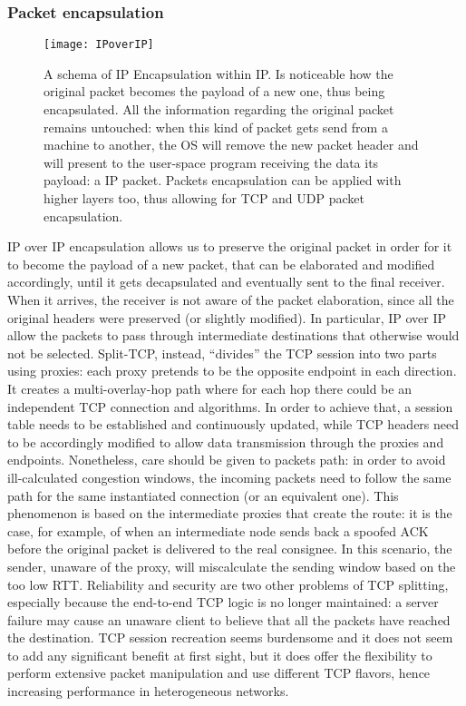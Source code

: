 \subsubsection*{Packet encapsulation}
\begin{figure}[t]
  \centering \texttt{[image: IPoverIP]}
  \caption[IP Encapsulation within IP packet schema]{A schema of IP
    Encapsulation within IP. Is noticeable how the original packet becomes the
    payload of a new one, thus being encapsulated. All the information
    regarding the original packet remains untouched: when this kind of packet
    gets send from a machine to another, the OS will remove the new packet
    header and will present to the user-space program receiving the data its
    payload: a IP packet. Packets encapsulation can be applied with higher
    layers too, thus allowing for TCP and UDP packet encapsulation.}
  \label{chap:prjan:img:ip_over_ip}
\end{figure}
IP over IP encapsulation allows us to preserve the original packet in order for
it
to become the payload of a new packet, that can be elaborated and modified
accordingly, until it gets decapsulated and eventually sent to the final
receiver. When it arrives, the receiver is not aware of the packet
elaboration, since all the original headers were preserved (or slightly
modified). In particular, IP over IP allow the packets to pass through
intermediate destinations that otherwise would not be selected. Split-TCP,
instead, ``divides'' the TCP session into two parts using proxies: each proxy
pretends to be the opposite endpoint in each direction. It creates a
multi-overlay-hop path where for each hop there could be an independent TCP
connection and algorithms. In order to achieve that, a session
table needs to be established and continuously updated, while TCP headers need
to be accordingly modified to allow data transmission through the proxies and
endpoints. Nonetheless, care should be given to packets path: in order to avoid
ill-calculated congestion windows, the incoming packets need to follow the same
path for the same instantiated connection (or an equivalent one). This
phenomenon is based on the intermediate proxies that create the route: it is the
case, for example, of when an intermediate node sends back a spoofed ACK before
the original packet is delivered to the real consignee. In this scenario, the
sender, unaware of the proxy, will miscalculate the sending window based on the
too low RTT. Reliability and security are two other problems of TCP splitting,
especially because the end-to-end TCP logic is no longer maintained: a server
failure may cause an unaware client to believe that all the packets have
reached the destination. TCP session recreation seems burdensome and it does not
seem to add any significant benefit at first sight, but it does offer the
flexibility to perform extensive packet manipulation and use different TCP
flavors, hence increasing performance in heterogeneous networks.

